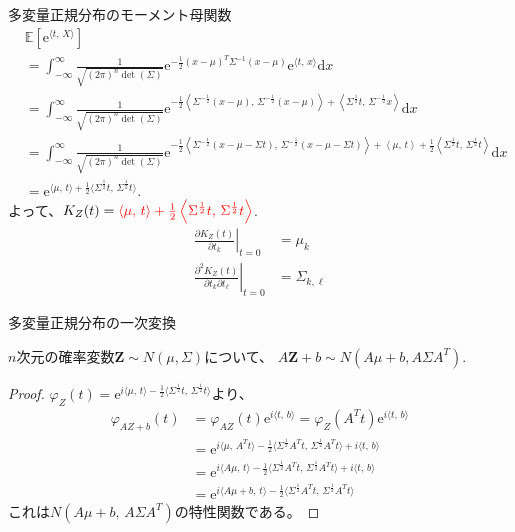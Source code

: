 \documentclass[lualatex,handout]{beamer}
\newcommand{\mycolor}[2]{%
  \begingroup
  \colorlet{currentcolor}{.}%
  \color{#1}#2%
  \color{currentcolor}%
  \endgroup
}
\newcommand{\emm}[1]{\mycolor{red}{#1}}
\newcommand{\expt}[1]{\mathbb{E}\left[#1\right]}
\theoremstyle{definition}
\begin{document}
\begin{frame}{多変量正規分布のモーメント母関数}
\small
\begin{align*}
&\expt{\mathrm{e}^{\langle t,\,X\rangle}}\\
&=\int_{-\infty}^\infty \frac1{\sqrt{(2\pi)^n\det(\Sigma)}} \mathrm{e}^{-\frac12 (x-\mu)^T\Sigma^{-1} (x-\mu)}\mathrm{e}^{\langle t,\, x\rangle}\mathrm{d}x\\
&= \int_{-\infty}^\infty \frac1{\sqrt{(2\pi)^n\det(\Sigma)}} \mathrm{e}^{-\frac12 \left\langle\Sigma^{-\frac12}(x-\mu),\,\Sigma^{-\frac12}(x-\mu)\right\rangle+\left\langle \Sigma^{\frac12}t,\, \Sigma^{-\frac12}x\right\rangle}\mathrm{d}x\\
&= \int_{-\infty}^\infty \frac1{\sqrt{(2\pi)^n\det(\Sigma)}} \mathrm{e}^{-\frac12 \left\langle\Sigma^{-\frac12}(x-\mu-\Sigma t),\,\Sigma^{-\frac12}(x-\mu-\Sigma t)\right\rangle +\left\langle \mu,\, t\right\rangle + \frac12\left\langle \Sigma^\frac12t,\,\Sigma^\frac12t\right\rangle}\mathrm{d}x\\
&= \mathrm{e}^{\langle \mu,\, t\rangle + \frac12\langle \Sigma^\frac12t,\,\Sigma^\frac12t\rangle}.
\end{align*}
よって、$K_Z(t) = \emm{\langle \mu,\, t\rangle + \frac12\left\langle \Sigma^\frac12t,\,\Sigma^\frac12t\right\rangle}$.
\begin{align*}
\left.\frac{\partial K_Z(t)}{\partial t_k}\right|_{t=0} &= \mu_k\\
\left.\frac{\partial^2 K_Z(t)}{\partial t_k\partial t_\ell}\right|_{t=0} &= \Sigma_{k, \ell}
\end{align*}
\end{frame}

\begin{frame}{多変量正規分布の一次変換}
\begin{lemma}
$n$次元の確率変数$\symbf{Z}\sim N(\mu, \Sigma)$について、
$A\symbf{Z}+b\sim N(A\mu+b, A\Sigma A^T)$.
\end{lemma}
\begin{proof}
$\varphi_Z(t) = \mathrm{e}^{i\langle \mu,\, t\rangle - \frac12\langle \Sigma^\frac12t,\,\Sigma^\frac12t\rangle}$より、
\begin{align*}
\varphi_{AZ+b}(t) &= \varphi_{AZ}(t)\mathrm{e}^{i\langle t,\,b\rangle} = \varphi_Z(A^Tt)\mathrm{e}^{i\langle t,\,b\rangle}\\
&= \mathrm{e}^{i\langle \mu,\, A^T t\rangle - \frac12\langle \Sigma^\frac12A^T t,\,\Sigma^\frac12A^T t\rangle + i\langle t,\,b\rangle}\\
&= \mathrm{e}^{i\langle A\mu,\, t\rangle - \frac12\langle \Sigma^\frac12A^T t,\,\Sigma^\frac12A^T t\rangle+ i\langle t,\,b\rangle}\\
&= \mathrm{e}^{i\langle A\mu + b,\, t\rangle - \frac12\langle \Sigma^\frac12A^T t,\,\Sigma^\frac12A^T t\rangle}
\end{align*}
これは$N(A\mu+b,\, A\Sigma A^T)$の特性関数である。
\end{proof}
\end{frame}
\end{document}
